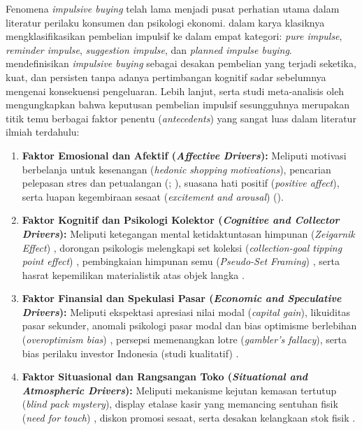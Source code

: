 \documentclass[12pt,a4paper]{article}
\numberwithin{equation}{section}
\numberwithin{table}{section}
\numberwithin{figure}{section}
\begin{document}
Fenomena \emph{impulsive buying} telah lama menjadi pusat perhatian utama dalam literatur perilaku konsumen dan psikologi ekonomi. \citet{stern1962significance} dalam karya klasiknya mengklasifikasikan pembelian impulsif ke dalam empat kategori: \emph{pure impulse}, \emph{reminder impulse}, \emph{suggestion impulse}, dan \emph{planned impulse buying}. \citet{rook1987buying} mendefinisikan \emph{impulsive buying} sebagai desakan pembelian yang terjadi seketika, kuat, dan persisten tanpa adanya pertimbangan kognitif sadar sebelumnya mengenai konsekuensi pengeluaran. Lebih lanjut, \citet{beatty1998impulse} serta studi meta-analisis oleh \citet{amos2014meta} mengungkapkan bahwa keputusan pembelian impulsif sesungguhnya merupakan titik temu berbagai faktor penentu (\emph{antecedents}) yang sangat luas dalam literatur ilmiah terdahulu:
\begin{enumerate}
  \item \textbf{Faktor Emosional dan Afektif (\emph{Affective Drivers}):} Meliputi motivasi berbelanja untuk kesenangan (\emph{hedonic shopping motivations}), pencarian pelepasan stres dan petualangan (\citealp{babin1994work}; \citealp{arnold2003hedonic}), suasana hati positif (\emph{positive affect}), serta luapan kegembiraan sesaat (\emph{excitement and arousal}) (\citealp{gueltekin2012influence}).
  \item \textbf{Faktor Kognitif dan Psikologi Kolektor (\emph{Cognitive and Collector Drivers}):} Meliputi ketegangan mental ketidaktuntasan himpunan (\emph{Zeigarnik Effect}) \citep{zeigarnik1927behalten}, dorongan psikologis melengkapi set koleksi (\emph{collection-goal tipping point effect}) \citep{gao2014completing}, pembingkaian himpunan semu (\emph{Pseudo-Set Framing}) \citep{barasz2017pseudo}, serta hasrat kepemilikan materialistik atas objek langka \citep{belk1995collecting}.
  \item \textbf{Faktor Finansial dan Spekulasi Pasar (\emph{Economic and Speculative Drivers}):} Meliputi ekspektasi apresiasi nilai modal (\emph{capital gain}), likuiditas pasar sekunder, anomali psikologi pasar modal dan bias optimisme berlebihan (\emph{overoptimism bias}) \citep{shiller2000irrational, baur2018bitcoin}, persepsi memenangkan lotre (\emph{gambler's fallacy}), serta bias perilaku investor Indonesia (studi kualitatif) \citep{colline2024biases}.
  \item \textbf{Faktor Situasional dan Rangsangan Toko (\emph{Situational and Atmospheric Drivers}):} Meliputi mekanisme kejutan kemasan tertutup (\emph{blind pack mystery}), display etalase kasir yang memancing sentuhan fisik (\emph{need for touch}) \citep{peck2006if}, diskon promosi sesaat, serta desakan kelangkaan stok fisik \citep{amos2014meta}.
\end{enumerate}
\end{document}
